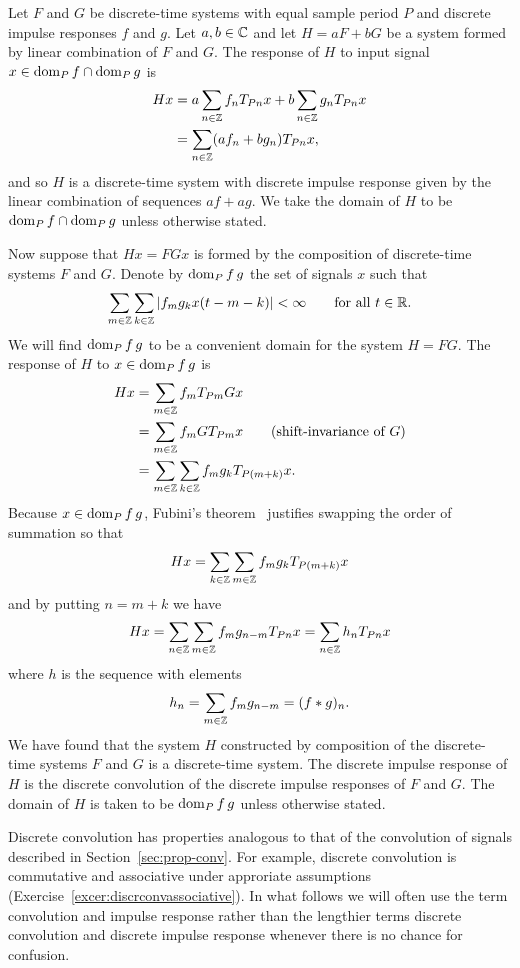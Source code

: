 Let $F$ and $G$ be discrete-time systems with equal sample period $P$ and discrete impulse responses $f$ and $g$.  Let $a,b\in{\mathbb C}$ and let $H = a F + b G$ be a system formed by linear combination of $F$ and $G$.  The response of $H$ to input signal $x \in \operatorname{dom}_P f \cap \operatorname{dom}_P g$ is
\begin{align*}
Hx &= a \sum_{n \in {\mathbb Z}} f_{n} T_{ P n}x + b \sum_{n \in {\mathbb Z}} g_{n} T_{ P n}x \\
&=  \sum_{n \in {\mathbb Z}} (a f_{n} + b g_{n}) T_{ P n}x,
\end{align*}
and so $H$ is a discrete-time system with discrete impulse response given by the linear combination of sequences $af + ag$.  We take the domain of $H$ to be $\operatorname{dom}_P f \cap \operatorname{dom}_P g$ unless otherwise stated.

Now suppose that $Hx = F Gx$ is formed by the composition of discrete-time systems $F$ and $G$.  Denote by $\operatorname{dom}_P f\,g$ the set of signals $x$ such that
\[
\sum_{m \in {\mathbb Z}} \sum_{k \in {\mathbb Z}} \left\vert f_m g_k x(t - m - k) \right\vert < \infty \qquad \text{for all $t \in {\mathbb R}$}. 
\]  
We will find $\operatorname{dom}_P f\,g$ to be a convenient domain for the system $H = FG$.  The response of $H$ to $x \in \operatorname{dom}_P f\,g$ is
\begin{align*}
H x &= \sum_{m \in {\mathbb Z}} f_m T_{Pm} G x  \\
&= \sum_{m \in {\mathbb Z}} f_m  G T_{Pm} x  \qquad \text{(shift-invariance of $G$)} \\
&= \sum_{m \in {\mathbb Z}} \sum_{k \in {\mathbb Z}} f_m g_k T_{P(m+k)}x.
\end{align*}
Because $x \in \operatorname{dom}_P f\,g$, Fubini's theorem~\cite[Theorem~8.8]{Rudin_real_and_complex_analysis} justifies swapping the order of summation so that
\[
H x = \sum_{k \in {\mathbb Z}} \sum_{m \in {\mathbb Z}} f_m g_k T_{P(m+k)}x
\]
and by putting $n = m+k$ we have
\begin{align}
Hx =  \sum_{n \in {\mathbb Z}} \sum_{m \in {\mathbb Z}} f_m g_{n-m} T_{Pn}x = \sum_{n \in {\mathbb Z}} h_n T_{Pn}x \nonumber
\end{align}
where $h$ is the sequence with elements
\[
h_n = \sum_{m \in {\mathbb Z}} f_m g_{n-m} = (f * g)_n .
\]
We have found that the system $H$ constructed by composition of the discrete-time systems $F$ and $G$ is a discrete-time system.  The discrete impulse response of $H$ is the discrete convolution of the discrete impulse responses of $F$ and $G$.  The domain of $H$ is taken to be $\operatorname{dom}_P f\,g$ unless otherwise stated.  

Discrete convolution has properties analogous to that of the convolution of signals described in Section~\ref{sec:prop-conv}.  For example, discrete convolution is commutative and associative under approriate assumptions (Exercise~\ref{excer:discrconvassociative}).
In what follows we will often use the term convolution and impulse response rather than the lengthier terms discrete convolution and discrete impulse response whenever there is no chance for confusion.

